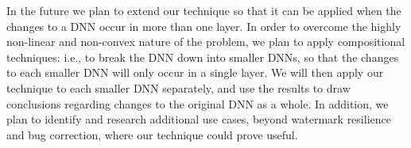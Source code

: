 \documentclass{easychair}
\newcommand{\guy}[1]{\marginpar{\textcolor{orange}{Guy: #1}}}
\begin{document}
In the future we plan to extend our technique so that it can be
applied when the changes to a DNN occur in more than one layer. In
order to overcome the highly non-linear and non-convex nature of the
problem, we plan to apply compositional techniques: i.e., to break the DNN
down into smaller DNNs, so that the changes to each smaller DNN will only occur in
a single layer. We will then apply our technique to each smaller DNN
separately, and use the results to draw conclusions regarding changes
to the original DNN as a whole. In addition, we plan to identify and  research additional
use cases, beyond watermark resilience and bug correction, where our technique
could prove useful.







\end{document}
